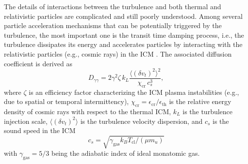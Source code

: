 \documentclass[twocolumn]{aastex62}
\newcommand{\R}[1]{\mathrm{#1}}
\newcommand{\editone}[1]{{\leavevmode\color{cyan}#1}}
\begin{document}
The details of interactions between the turbulence and both thermal and
relativistic particles are complicated and still poorly understood.
Among several particle acceleration mechanisms that can be potentially
triggered by the turbulence, the most important one is the transit time
damping process, i.e., the turbulence dissipates its energy and
accelerates particles by interacting with the relativistic particles
(e.g., cosmic rays) in the ICM
\citep[and references therein]{brunetti2007,brunetti2011}.
The associated diffusion coefficient is derived as
\citep{miniati2015,pinzke2017}
\begin{equation}
  \label{eq:dpp}
  D_{\gamma\gamma} = 2 \gamma^2 \zeta \,k_L
    \frac{\langle (\delta v_t)^2 \rangle^2}{\chi_{\R{cr}} \, c_s^3},
\end{equation}
where
$\zeta$ is an efficiency factor characterizing the ICM plasma instabilities
(e.g., due to spatial or temporal intermittency),
$\chi_{\R{cr}} = \epsilon_{\R{cr}} / \epsilon_{\R{th}}$ is the relative
energy density of cosmic rays with respect to the thermal ICM,
\editone{$k_L$ is the turbulence injection scale},
$\langle (\delta v_t)^2 \rangle$ is the turbulence velocity dispersion,
and $c_s$ is the sound speed in the ICM
\begin{equation}
  \label{eq:sound-speed}
  c_s = \sqrt{\gamma_{\R{gas}} k_B T_{\R{cl}} / (\mu m_u)}
\end{equation}
with $\gamma_{\R{gas}} = 5/3$ being the adiabatic index
of ideal monatomic gas.
\end{document}
